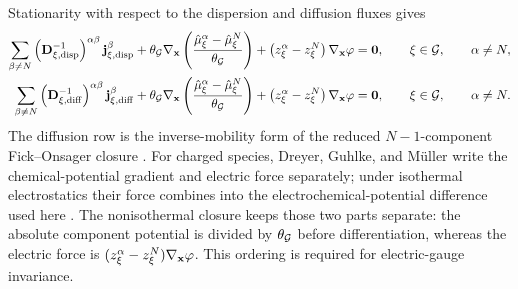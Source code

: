 Stationarity with respect to the dispersion and diffusion fluxes gives
%
\begin{align}
	\sum_{\beta\ne N}
	\left(\mathbf{D}_{\xi,{\rm disp}}^{-1}\right)^{\alpha\beta}
	\mathbf{j}_{\xi,{\rm disp}}^\beta
	+
	\theta_{\mathcal{G}}
	\nabla_{\mathbf{x}}
	\left(
		\frac{
			\hat\mu_\xi^\alpha-\hat\mu_\xi^N
		}{\theta_{\mathcal{G}}}
	\right)
	+
	\left(
		z_\xi^\alpha-z_\xi^N
	\right)
	\nabla_{\mathbf{x}}\varphi
	 & =\mathbf{0},
	\qquad
	\xi\in\mathcal{G},
	\qquad
	\alpha\ne N,
	\label{eq:MC_onsager_dispersion_stationarity}
	\\
	\sum_{\beta\ne N}
	\left(\mathbf{D}_{\xi,{\rm diff}}^{-1}\right)^{\alpha\beta}
	\mathbf{j}_{\xi,{\rm diff}}^\beta
	+
	\theta_{\mathcal{G}}
	\nabla_{\mathbf{x}}
	\left(
		\frac{
			\hat\mu_\xi^\alpha-\hat\mu_\xi^N
		}{\theta_{\mathcal{G}}}
	\right)
	+
	\left(
		z_\xi^\alpha-z_\xi^N
	\right)
	\nabla_{\mathbf{x}}\varphi
	 & =\mathbf{0},
	\qquad
	\xi\in\mathcal{G},
	\qquad
	\alpha\ne N.
	\label{eq:MC_onsager_diffusion_stationarity}
\end{align}
%
The diffusion row is the inverse-mobility form of the reduced
\(N-1\)-component Fick--Onsager closure
\cite{bothe2015continuum,bothe2023diffusion_fluxes}.  For charged species,
Dreyer, Guhlke, and M{\"u}ller write the chemical-potential gradient and
electric force separately; under isothermal electrostatics their force combines
into the electrochemical-potential difference used here
\cite{dreyer2018bulk_surface_electrothermodynamics}.  The nonisothermal closure
keeps those two parts separate: the absolute component potential is divided by
\(\theta_{\mathcal{G}}\) before differentiation, whereas the electric force is
\((z_\xi^\alpha-z_\xi^N)\nabla_{\mathbf{x}}\varphi\).  This ordering is required
for electric-gauge invariance.

